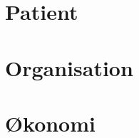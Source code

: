 %


\raggedbottom

\mainmatter 

%

%


%
%
%
%
%
%
%
%
%
%


%

%
\chapter{Patient}

%
\chapter{Organisation}

%
\chapter{Økonomi}

\begingroup \label{litteratur}
\raggedright


\endgroup


